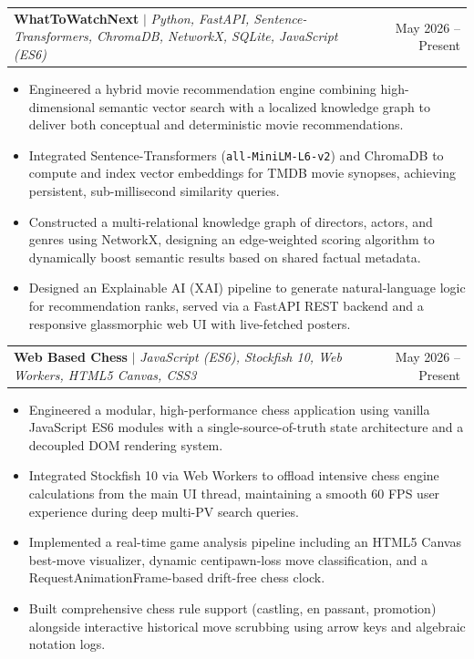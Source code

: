 \documentclass[letterpaper,11pt]{article}
\makeatletter
\newcommand{\resumeItem}[1]{
  \item\small{
    {#1 \vspace{-2pt}}
  }
}
\newcommand{\resumeProjectHeading}[2]{
    \item
    \begin{tabular*}{0.97\textwidth}{l@{\extracolsep{\fill}}r}
      \small#1 & #2 \\
    \end{tabular*}\vspace{-7pt}
}
\newcommand{\resumeItemListStart}{\begin{itemize}}
\newcommand{\resumeItemListEnd}{\end{itemize}\vspace{-5pt}}
\makeatother
\begin{document}
      \resumeProjectHeading
          {\textbf{WhatToWatchNext} $|$ \emph{Python, FastAPI, Sentence-Transformers, ChromaDB, NetworkX, SQLite, JavaScript (ES6)}}{May 2026 -- Present}
          \resumeItemListStart
            \resumeItem{Engineered a hybrid movie recommendation engine combining high-dimensional semantic vector search with a localized knowledge graph to deliver both conceptual and deterministic movie recommendations.}
            \resumeItem{Integrated Sentence-Transformers (\texttt{all-MiniLM-L6-v2}) and ChromaDB to compute and index vector embeddings for TMDB movie synopses, achieving persistent, sub-millisecond similarity queries.}
            \resumeItem{Constructed a multi-relational knowledge graph of directors, actors, and genres using NetworkX, designing an edge-weighted scoring algorithm to dynamically boost semantic results based on shared factual metadata.}
            \resumeItem{Designed an Explainable AI (XAI) pipeline to generate natural-language logic for recommendation ranks, served via a FastAPI REST backend and a responsive glassmorphic web UI with live-fetched posters.}
          \resumeItemListEnd

      \resumeProjectHeading
          {\textbf{Web Based Chess} $|$ \emph{JavaScript (ES6), Stockfish 10, Web Workers, HTML5 Canvas, CSS3}}{May 2026 -- Present}
          \resumeItemListStart
            \resumeItem{Engineered a modular, high-performance chess application using vanilla JavaScript ES6 modules with a single-source-of-truth state architecture and a decoupled DOM rendering system.}
            \resumeItem{Integrated Stockfish 10 via Web Workers to offload intensive chess engine calculations from the main UI thread, maintaining a smooth 60 FPS user experience during deep multi-PV search queries.}
            \resumeItem{Implemented a real-time game analysis pipeline including an HTML5 Canvas best-move visualizer, dynamic centipawn-loss move classification, and a RequestAnimationFrame-based drift-free chess clock.}
            \resumeItem{Built comprehensive chess rule support (castling, en passant, promotion) alongside interactive historical move scrubbing using arrow keys and algebraic notation logs.}
          \resumeItemListEnd
\end{document}
